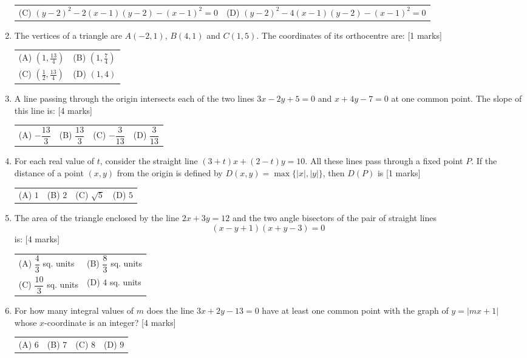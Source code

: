 \documentclass[11pt,a4paper]{article}
\begin{document}
\begin{enumerate}[resume]
{\begin{tabularx}{\linewidth}{X X}
(C) \quad $(y-2)^2-2(x-1)(y-2)-(x-1)^2=0$ & (D) \quad $(y-2)^2-4(x-1)(y-2)-(x-1)^2=0$ \\[10pt]
\end{tabularx}}
\item The vertices of a triangle are $A(-2,1)$, $B(4,1)$ and $C(1,5)$. The coordinates of its orthocentre are: \hfill [1 marks]
{\renewcommand{\arraystretch}{1.8}
\begin{tabularx}{\linewidth}{X X}
(A) \quad $(1,\frac{13}{4})$ & (B) \quad $(1,\frac{7}{4})$ \\[10pt]
(C) \quad $(\frac{1}{2},\frac{13}{4})$ & (D) \quad $(1,4)$ \\[10pt]
\end{tabularx}}
\item A line passing through the origin intersects each of the two lines $3x-2y+5=0$ and $x+4y-7=0$ at one common point. The slope of this line is: \hfill [4 marks]
{\renewcommand{\arraystretch}{1.8}
\begin{tabularx}{\linewidth}{X X X X}
(A) \quad $-\dfrac{13}{3}$ & (B) \quad $\dfrac{13}{3}$ & (C) \quad $-\dfrac{3}{13}$ & (D) \quad $\dfrac{3}{13}$ \\[10pt]
\end{tabularx}}
\item For each real value of $t$, consider the straight line $(3+t)x+(2-t)y=10$. All these lines pass through a fixed point $P$. If the distance of a point $(x,y)$ from the origin is defined by $D(x,y)=\max\{|x|,|y|\}$, then $D(P)$ is \hfill [1 marks]
{\renewcommand{\arraystretch}{1.8}
\begin{tabularx}{\linewidth}{X X X X}
(A) \quad $1$ & (B) \quad $2$ & (C) \quad $\sqrt{5}$ & (D) \quad $5$ \\[10pt]
\end{tabularx}}
\item The area of the triangle enclosed by the line $2x+3y=12$ and the two angle bisectors of the pair of straight lines
\[
(x-y+1)(x+y-3)=0
\]
is: \hfill [4 marks]
{\renewcommand{\arraystretch}{1.8}
\begin{tabularx}{\linewidth}{X X}
(A) \quad $\dfrac{4}{3}$ sq. units & (B) \quad $\dfrac{8}{3}$ sq. units \\[10pt]
(C) \quad $\dfrac{10}{3}$ sq. units & (D) \quad $4$ sq. units \\[10pt]
\end{tabularx}}
\item For how many integral values of $m$ does the line $3x+2y-13=0$ have at least one common point with the graph of $y=|mx+1|$ whose $x$-coordinate is an integer? \hfill [4 marks]
{\renewcommand{\arraystretch}{1.8}
\begin{tabularx}{\linewidth}{X X X X}
(A) \quad $6$ & (B) \quad $7$ & (C) \quad $8$ & (D) \quad $9$ \\[10pt]
\end{tabularx}}
\end{enumerate}
\end{document}
